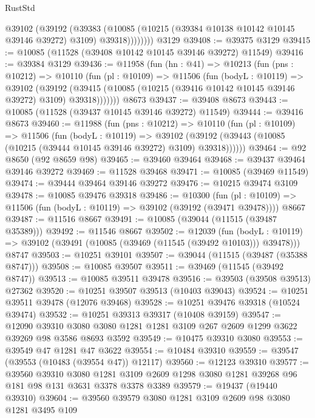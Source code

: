 \begin{lexlean}{RustStd}
\begin{coremodule}
            @39102
              (@39192
                (@39383
                  (@10085 (@10215 (@39384 @10138 @10142 @10145 @39146 @39272) @3109) @39318))))))))
    @3129
@39408 := @39375 @3129
@39415 := @10085 (@11528 (@39408 @10142 @10145 @39146 @39272) @11549)
@39416 := @39384 @3129
@39436 := @11958
    (fun (hn : @41) =>
    @10213
      (fun (pns : @10212) =>
      @10110
        (fun (pl : @10109) =>
        @11506
          (fun (bodyL : @10119) =>
          @39102
            (@39192
              (@39415 (@10085 (@10215 (@39416 @10142 @10145 @39146 @39272) @3109) @39318)))))))
    @8673
@39437 := @39408 @8673
@39443 := @10085 (@11528 (@39437 @10145 @39146 @39272) @11549)
@39444 := @39416 @8673
@39460 := @11988
    (fun (pns : @10212) =>
    @10110
      (fun (pl : @10109) =>
      @11506
        (fun (bodyL : @10119) =>
        @39102 (@39192 (@39443 (@10085 (@10215 (@39444 @10145 @39146 @39272) @3109) @39318))))))
@39464 := @92 @8650 (@92 @8659 @98)
@39465 := @39460 @39464
@39468 := @39437 @39464 @39146 @39272
@39469 := @11528 @39468
@39471 := @10085 (@39469 @11549)
@39474 := @39444 @39464 @39146 @39272
@39476 := @10215 @39474 @3109
@39478 := @10085 @39476 @39318
@39486 := @10300
    (fun (pl : @10109) => @11506 (fun (bodyL : @10119) => @39102 (@39192 (@39471 @39478))))
    @8667
@39487 := @11516 @8667
@39491 := @10085 (@39044 (@11515 (@39487 @35389)))
@39492 := @11546 @8667
@39502 := @12039
    (fun (bodyL : @10119) => @39102 (@39491 (@10085 (@39469 (@11545 (@39492 @10103))) @39478)))
    @8747
@39503 := @10251 @39101
@39507 := @39044 (@11515 (@39487 (@35388 @8747)))
@39508 := @10085 @39507
@39511 := @39469 (@11545 (@39492 @8747))
@39513 := @10085 @39511 @39478
@39516 := @39503 (@39508 @39513) @27362
@39520 := @10251 @39507 @39513 (@10403 @39043)
@39524 := @10251 @39511 @39478 (@12076 @39468)
@39528 := @10251 @39476 @39318 (@10524 @39474)
@39532 := @10251 @39313 @39317 (@10408 @39159)
@39547 := @12090
    @39310
    @3080
    @3080
    @1281
    @1281
    @3109
    @267
    @2609
    @1299
    @3622
    @39269
    @98
    @3586
    @8693
    @3592
@39549 := @10475 @39310 @3080
@39553 := @39549 @47 @1281 @47 @3622
@39554 := @10484 @39310
@39559 := @39547 (@39553 (@10483 (@39554 @47)) @12117)
@39560 := @12123 @39310
@39577 := @39560
    @39310
    @3080
    @1281
    @3109
    @2609
    @1298
    @3080
    @1281
    @39268
    @96
    @181
    @98
    @131
    @3631
    @3378
    @3378
    @3389
@39579 := @19437 (@19440 @39310)
@39604 := @39560
    @39579
    @3080
    @1281
    @3109
    @2609
    @98
    @3080
    @1281
    @3495
    @109

\end{coremodule}
\end{lexlean}
